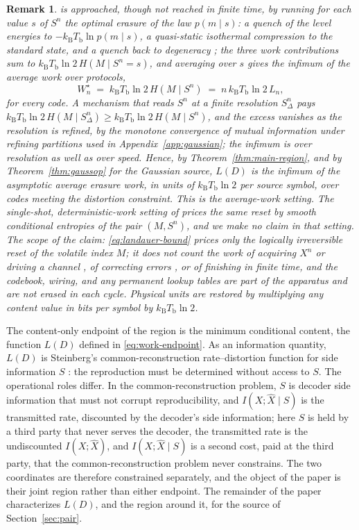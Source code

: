 \documentclass[11pt,onecolumn]{IEEEtran}
\newtheorem{remark}[theorem]{Remark}
\newcommand{\hX}{\widehat{X}}
\newcommand{\kb}{k_{\mathrm{B}}}
\begin{document}
\begin{remark}
is approached, though not reached in finite time, by running for each
value $s$ of $S^n$ the optimal erasure of the law $p(m\mid s)$: a quench
of the level energies to $-\kb T_{\mathrm b}\ln p(m\mid s)$, a
quasi-static isothermal compression to the standard state, and a quench
back to degeneracy \cite{esposito2011}; the three work contributions sum
to $\kb T_{\mathrm b}\ln2\,H(M\mid S^n=s)$, and averaging over $s$ gives
the infimum of the average work over protocols,
\begin{equation}
 W_n^{\star}\;=\;\kb T_{\mathrm b}\ln2\,H(M\mid S^n)\;=\;n\,\kb T_{\mathrm b}\ln2\,L_n ,
 \label{eq:landauer-bound}
\end{equation}
for every code. A mechanism that reads $S^n$ at a finite resolution
$S_\Delta^n$ pays $\kb T_{\mathrm b}\ln2\,H(M\mid S_\Delta^n)\ge\kb
T_{\mathrm b}\ln2\,H(M\mid S^n)$, and the excess vanishes as the
resolution is refined, by the monotone convergence of mutual information
under refining partitions used in Appendix~\ref{app:gaussian}; the
infimum is over resolution as well as over speed. Hence, by
Theorem~\ref{thm:main-region}, and by Theorem~\ref{thm:gaussop} for the
Gaussian source, $L(D)$ is the infimum of the asymptotic average erasure
work, in units of $\kb T_{\mathrm b}\ln2$ per source symbol, over codes
meeting the distortion constraint. This is the average-work setting. The
single-shot, deterministic-work setting of \cite{delrio2011,faist2015}
prices the same reset by smooth conditional entropies of the pair
$(M,S^n)$, and we make no claim in that setting. The scope of the claim:
\eqref{eq:landauer-bound} prices only the logically irreversible reset
of the volatile index $M$; it does not count the work of acquiring $X^n$
or driving a channel \cite{bennett1973}, of correcting errors
\cite{landauer1961}, or of finishing in finite time, and the codebook,
wiring, and any permanent lookup tables are part of the apparatus and are
not erased in each cycle. Physical units are restored by multiplying any
content value in bits per symbol by $\kb T_{\mathrm b}\ln2$.
\end{remark}



The content-only endpoint of the region is the minimum conditional content, the
function $L(D)$ defined in \eqref{eq:work-endpoint}.
As an information quantity, $L(D)$ is Steinberg's common-reconstruction
rate--distortion function for side information $S$ \cite{steinberg2009}: the
reproduction must be determined without access to $S$. The operational roles
differ. In the common-reconstruction problem, $S$ is decoder side information
that must not corrupt reproducibility, and $I(X;\hX\mid S)$ is the
transmitted rate, discounted by the decoder's side information; here $S$
is held by a third party that never serves the decoder, the transmitted
rate is the undiscounted $I(X;\hX)$, and $I(X;\hX\mid S)$ is a second
cost, paid at the third party, that the common-reconstruction problem
never constrains. The two coordinates are therefore constrained
separately, and the object of the paper is their joint region rather
than either endpoint. The remainder of the paper characterizes $L(D)$,
and the region around it, for the source of Section~\ref{sec:pair}.
\end{document}
